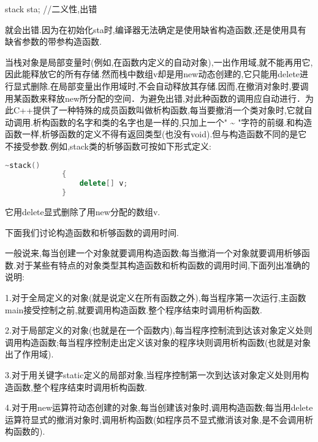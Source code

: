 \documentclass{article}
\begin{document}
stack sta; //二义性,出错

就会出错.因为在初始化sta时,编译器无法确定是使用缺省构造函数,还是使用具有缺省参数的带参构造函数.

当栈对象是局部变量时(例如,在函数内定义的自动对象),一出作用域,就不能再用它,因此能释放它的所有存储.然而栈中数组v却是用new动态创建的,它只能用delete进行显式删除.在局部变量出作用域时,不会自动释放其存储.因而,在撤消对象时,要调用某函数来释放new所分配的空间．为避免出错,对此种函数的调用应自动进行．为此C++提供了一种特殊的成员函数叫做析构函数,每当要撤消一个类对象时,它就自动调用.析构函数的名字和类的名字也是一样的,只加上一个" \textasciitilde{} "字符的前缀.和构造函数一样,析够函数的定义不得有返回类型(也没有void).但与构造函数不同的是它不接受参数.例如,stack类的析够函数可按如下形式定义:
\begin{lstlisting}[language=c++]
             ~stack()
             {
                 delete[] v;
             }
\end{lstlisting}
它用delete显式删除了用new分配的数组v.

下面我们讨论构造函数和析够函数的调用时间.

一般说来,每当创建一个对象就要调用构造函数;每当撤消一个对象就要调用析够函数.对于某些有特点的对象类型其构造函数和析构函数的调用时间,下面列出准确的说明:

1.对于全局定义的对象(就是说定义在所有函数之外),每当程序第一次运行,主函数main接受控制之前,就要调用构造函数.整个程序结束时调用析构函数.

2.对于局部定义的对象(也就是在一个函数内),每当程序控制流到达该对象定义处则调用构造函数;每当程序控制走出定义该对象的程序块则调用析构函数(也就是对象出了作用域).

3.对于用关键字static定义的局部对象,当程序控制第一次到达该对象定义处则用构造函数,整个程序结束时调用析构函数.

4.对于用new运算符动态创建的对象,每当创建该对象时,调用构造函数;每当用delete运算符显式的撤消对象时,调用析构函数(如程序员不显式撤消该对象,是不会调用析构函数的).
\end{document}
